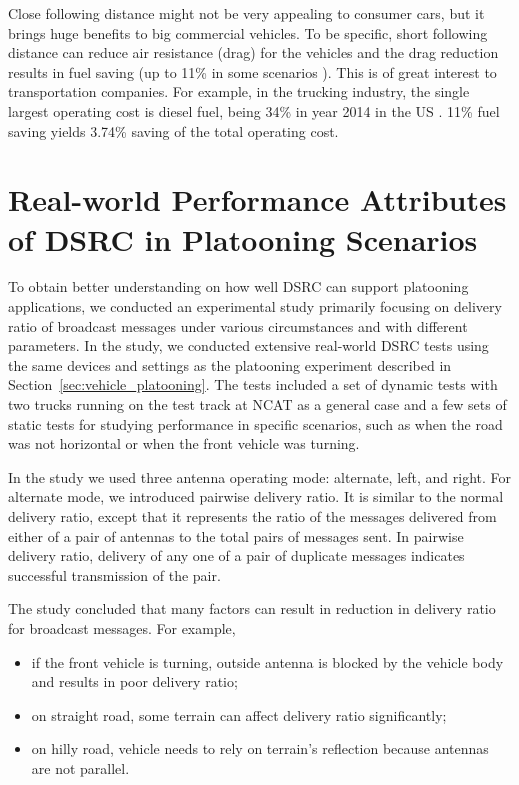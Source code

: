 \documentclass[12pt]{report}
\begin{document}
Close following distance might not be very appealing to consumer cars, but it brings huge benefits to big commercial vehicles. To be specific, short following distance can reduce air resistance (drag) for the vehicles \cite{watts2015computational,fhwa2015report} and the drag reduction results in fuel saving (up to 11\% in some scenarios \cite{lammert2014effect}). This is of great interest to transportation companies. For example, in the trucking industry, the single largest operating cost is diesel fuel, being 34\% in year 2014 in the US \cite{atri2015analysis}. 11\% fuel saving yields 3.74\% saving of the total operating cost.

\section{Real-world Performance Attributes of DSRC in Platooning Scenarios}

\label{sec:background_realworld_performance}

To obtain better understanding on how well DSRC can support platooning applications, we conducted an experimental study\cite{songDSRC2016} primarily focusing on delivery ratio of broadcast messages under various circumstances and with different parameters. In the study, we conducted extensive real-world DSRC tests using the same devices and settings as the platooning experiment described in Section~\ref{sec:vehicle_platooning}. The tests included a set of dynamic tests with two trucks running on the test track at NCAT as a general case and a few sets of static tests for studying performance in specific scenarios, such as when the road was not horizontal or when the front vehicle was turning.

In the study we used three antenna operating mode: alternate, left, and right. For alternate mode, we introduced pairwise delivery ratio. It is similar to the normal delivery ratio, except that it represents the ratio of the messages delivered from either of a pair of antennas to the total pairs of messages sent. In pairwise delivery ratio, delivery of any one of a pair of duplicate messages indicates successful transmission of the pair. 

The study concluded that many factors can result in reduction in delivery ratio for broadcast messages. For example,

\begin{itemize}
  \item if the front vehicle is turning, outside antenna is blocked by the vehicle body and results in poor delivery ratio;
  \item on straight road, some terrain can affect delivery ratio significantly;
  \item on hilly road, vehicle needs to rely on terrain's reflection because antennas are not parallel.
\end{itemize}
\end{document}
